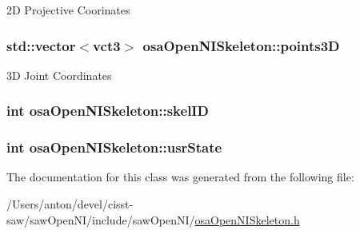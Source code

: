 2\+D Projective Coorinates 

\hypertarget{classosa_open_n_i_skeleton_a69590f30ce352cd80be31757dcea8351}{}
\subsubsection[{points3\+D}]{\setlength{\rightskip}{0pt plus 5cm}std\+::vector$<${\bf vct3}$>$ osa\+Open\+N\+I\+Skeleton\+::points3\+D}\label{classosa_open_n_i_skeleton_a69590f30ce352cd80be31757dcea8351}


3\+D Joint Coordinates 

\hypertarget{classosa_open_n_i_skeleton_acff0bacc1bc0f3411a2ee8ebd541e1b9}{}
\subsubsection[{skel\+I\+D}]{\setlength{\rightskip}{0pt plus 5cm}int osa\+Open\+N\+I\+Skeleton\+::skel\+I\+D}\label{classosa_open_n_i_skeleton_acff0bacc1bc0f3411a2ee8ebd541e1b9}
\hypertarget{classosa_open_n_i_skeleton_afd56b36e28cdc37b1f8e9e028537af41}{}
\subsubsection[{usr\+State}]{\setlength{\rightskip}{0pt plus 5cm}int osa\+Open\+N\+I\+Skeleton\+::usr\+State}\label{classosa_open_n_i_skeleton_afd56b36e28cdc37b1f8e9e028537af41}


The documentation for this class was generated from the following file\+:\begin{DoxyCompactItemize}
\item 
/\+Users/anton/devel/cisst-\/saw/saw\+Open\+N\+I/include/saw\+Open\+N\+I/\hyperlink{osa_open_n_i_skeleton_8h}{osa\+Open\+N\+I\+Skeleton.\+h}\end{DoxyCompactItemize}
